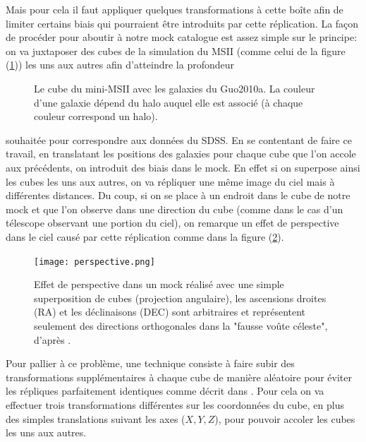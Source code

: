 Mais pour cela il faut appliquer quelques transformations à cette boîte afin de limiter certains biais qui pourraient être
introduits par cette réplication.
La façon de procéder pour aboutir à notre mock catalogue est assez simple sur le principe: on va juxtaposer des cubes de la
simulation du MSII (comme celui de la figure (\ref{fig:cube})) les uns aux autres afin d'atteindre la profondeur
\begin{figure}[htb]
	\centering
	\caption{\footnotesize{}Le cube du mini-MSII avec les galaxies du Guo2010a. La couleur d'une galaxie dépend du halo auquel
	elle est associé (à chaque couleur correspond un halo).}
	\label{fig:cube}
\end{figure}
souhaitée pour correspondre aux données du SDSS. En se contentant de faire ce travail, en translatant les positions des galaxies
pour chaque cube que l'on accole aux précédents, on introduit des biais dans le mock. En effet si on superpose ainsi les cubes les
uns aux autres, on va répliquer une même image du ciel mais à différentes distances. Du coup, si on se place à un endroit dans le
cube de notre mock et que l'on observe dans une direction du cube (comme dans le cas d'un télescope observant une portion du ciel),
on remarque un effet de perspective dans le ciel causé par cette réplication comme dans la figure (\ref{fig:perspective}).
\begin{figure}[htb]
        \centering
	\texttt{[image: perspective.png]}
	\caption{\footnotesize{}Effet de perspective dans un mock réalisé avec une simple superposition de cubes
	(projection angulaire), les ascensions droites (RA) et les déclinaisons (DEC) sont arbitraires et
	représentent seulement des directions orthogonales dans la "fausse voûte céleste", d'après \citet{Blaizot+05}.}
	\label{fig:perspective}
\end{figure}

Pour pallier à ce problème, une technique consiste à faire subir des transformations supplémentaires à chaque cube de manière
aléatoire pour éviter les répliques parfaitement identiques comme décrit dans \citet{Blaizot+05}. Pour cela on va effectuer trois
transformations différentes sur les coordonnées du cube, en plus des simples translations suivant les axes ($X,Y,Z$), pour pouvoir
accoler les cubes les uns aux autres.

